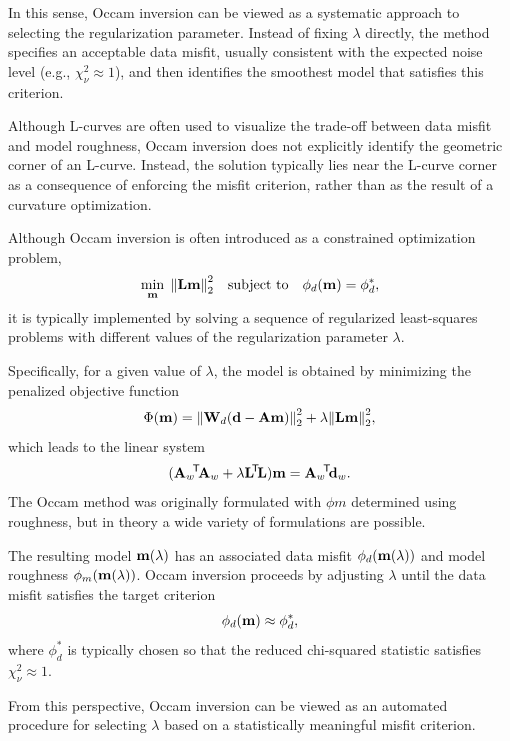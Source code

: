 In this sense, Occam inversion can be viewed as a systematic approach to selecting the regularization parameter. Instead of fixing $\lambda$ directly, the method specifies an acceptable data misfit, usually consistent with the expected noise level (e.g., $\chi_\nu^2 \approx 1$), and then identifies the smoothest model that satisfies this criterion.

Although L-curves are often used to visualize the trade-off between data misfit and model roughness, Occam inversion does not explicitly identify the geometric corner of an L-curve. Instead, the solution typically lies near the L-curve corner as a consequence of enforcing the misfit criterion, rather than as the result of a curvature optimization.

Although Occam inversion is often introduced as a constrained optimization problem,
\begin{equation}
    \min_{\vb{m}} \; \norm{\vb{L}\vb{m}}_2^2
    \quad \text{subject to} \quad
    \phi_d(\vb{m}) = \phi_d^*,
\end{equation}
it is typically implemented by solving a sequence of regularized least-squares problems with different values of the regularization parameter $\lambda$.

Specifically, for a given value of $\lambda$, the model is obtained by minimizing the penalized objective function
\begin{equation}
    \Phi(\vb{m}) =
    \norm{\vb{W}_d(\vb{d} - \vb{A}\vb{m})}_2^2
    + \lambda \norm{\vb{L}\vb{m}}_2^2,
\end{equation}
which leads to the linear system
\begin{equation}
    (\vb{A}_w\!^\mathsf{T}\! \vb{A}_w + \lambda \vb{L}\!^\mathsf{T}\! \vb{L}) \vb{m}
    = \vb{A}_w\!^\mathsf{T}\! \vb{d}_w.
\end{equation}
The Occam method was originally formulated with $\phi{m}$ determined using roughness, but in theory a wide variety of formulations are possible.

The resulting model $\vb{m}(\lambda)$ has an associated data misfit $\phi_d(\vb{m}(\lambda))$ and model roughness $\phi_m(\vb{m}(\lambda))$. Occam inversion proceeds by adjusting $\lambda$ until the data misfit satisfies the target criterion
\begin{equation}
    \phi_d(\vb{m}) \approx \phi_d^*,
\end{equation}
where $\phi_d^*$ is typically chosen so that the reduced chi-squared statistic satisfies $\chi_\nu^2 \approx 1$.

From this perspective, Occam inversion can be viewed as an automated procedure for selecting $\lambda$ based on a statistically meaningful misfit criterion.

